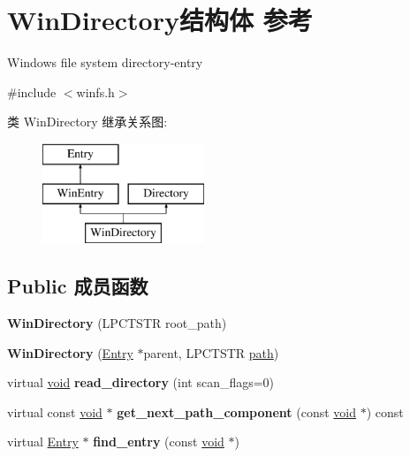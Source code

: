 \hypertarget{struct_win_directory}{}\section{Win\+Directory结构体 参考}
\label{struct_win_directory}


Windows file system directory-\/entry  




{\ttfamily \#include $<$winfs.\+h$>$}

类 Win\+Directory 继承关系图\+:\begin{figure}[H]
\begin{center}
\leavevmode
\includegraphics[height=3.000000cm]{struct_win_directory}
\end{center}
\end{figure}
\subsection*{Public 成员函数}
\begin{DoxyCompactItemize}
\item 
\mbox{\label{struct_win_directory_af6a7b2e6701853dfebb0f3122af3c13a}} 
{\bfseries Win\+Directory} (L\+P\+C\+T\+S\+TR root\+\_\+path)
\item 
\mbox{\label{struct_win_directory_af24523810709e87423956ce01badc1f9}} 
{\bfseries Win\+Directory} (\hyperlink{struct_entry}{Entry} $\ast$parent, L\+P\+C\+T\+S\+TR \hyperlink{structpath}{path})
\item 
\mbox{\label{struct_win_directory_a5af65181d64ec14e5c523b359c932bec}} 
virtual \hyperlink{interfacevoid}{void} {\bfseries read\+\_\+directory} (int scan\+\_\+flags=0)
\item 
\mbox{\label{struct_win_directory_a273b083cf2d727fc1426bfee52656692}} 
virtual const \hyperlink{interfacevoid}{void} $\ast$ {\bfseries get\+\_\+next\+\_\+path\+\_\+component} (const \hyperlink{interfacevoid}{void} $\ast$) const
\item 
\mbox{\label{struct_win_directory_a55f3eb4302902464227538b3a5357d51}} 
virtual \hyperlink{struct_entry}{Entry} $\ast$ {\bfseries find\+\_\+entry} (const \hyperlink{interfacevoid}{void} $\ast$)
\end{DoxyCompactItemize}
